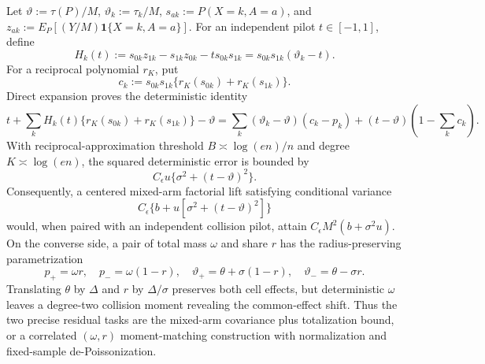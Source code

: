 Let \(\vartheta:=\tau(P)/M\), \(\vartheta_k:=\tau_k/M\), \(s_{ak}:=P(X=k,A=a)\), and \(z_{ak}:=E_P[(Y/M)\mathbf 1\{X=k,A=a\}]\).  For an independent pilot \(t\in[-1,1]\), define
\[
 H_k(t):=s_{0k}z_{1k}-s_{1k}z_{0k}-t s_{0k}s_{1k}
 =s_{0k}s_{1k}(\vartheta_k-t).
\]
For a reciprocal polynomial \(r_K\), put
\[
 c_k:=s_{0k}s_{1k}\{r_K(s_{0k})+r_K(s_{1k})\}.
\]
Direct expansion proves the deterministic identity
\[
 t+\sum_kH_k(t)\{r_K(s_{0k})+r_K(s_{1k})\}-\vartheta
 =\sum_k(\vartheta_k-\vartheta)(c_k-p_k)
 +(t-\vartheta)\left(1-\sum_kc_k\right).
\]
With reciprocal-approximation threshold \(B\asymp\log(en)/n\) and degree \(K\asymp\log(en)\), the squared deterministic error is bounded by
\[
 C_\epsilon u\{\sigma^2+(t-\vartheta)^2\}.
\]
Consequently, a centered mixed-arm factorial lift satisfying conditional variance
\[
 C_\epsilon\{b+u[\sigma^2+(t-\vartheta)^2]\}
\]
would, when paired with an independent collision pilot, attain \(C_\epsilon M^2(b+\sigma^2u)\).  On the converse side, a pair of total mass \(\omega\) and share \(r\) has the radius-preserving parametrization
\[
 p_+=\omega r,\quad p_-=\omega(1-r),\quad
 \vartheta_+=\theta+\sigma(1-r),\quad
 \vartheta_-=\theta-\sigma r.
\]
Translating \(\theta\) by \(\Delta\) and \(r\) by \(\Delta/\sigma\) preserves both cell effects, but deterministic \(\omega\) leaves a degree-two collision moment revealing the common-effect shift.  Thus the two precise residual tasks are the mixed-arm covariance plus totalization bound, or a correlated \((\omega,r)\) moment-matching construction with normalization and fixed-sample de-Poissonization.